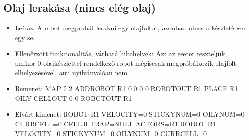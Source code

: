 \subsection{Olaj lerakása (nincs elég olaj)}
\begin{itemize}
	\item Leírás: \newline
	 A robot megpróbál lerakni egy olajfoltot, azonban nincs a készletében egy se.
	\item Ellenőrzött funkcionalitás, várható hibahelyek: \newline 
	Azt az esetet teszteljük, amikor 0 olajkészlettel rendelkező robot mégiscsak megpróbálkozik olajfolt elhelyezésével, ami nyilvánvalóan nem 
	\item Bemenet: \newline
	MAP 2 2 \newline
	ADDROBOT R1 0 0 0 0 \newline
	ROBOTOUT R1 \newline
	PLACE R1 OILY \newline
	CELLOUT 0 0 \newline
	ROBOTOUT R1 \newline
	\item Elvárt kimenet: \newline
	ROBOT R1 VELOCITY=0 STICKYNUM=0 OILYNUM=0 CURRCELL=0 \newline
	CELL 0 TRAP=NULL ACTORS=R1 \newline
	ROBOT R1 VELOCITY=0 STICKYNUM=0 OILYNUM=0 CURRCELL=0 \newline
\end{itemize}

